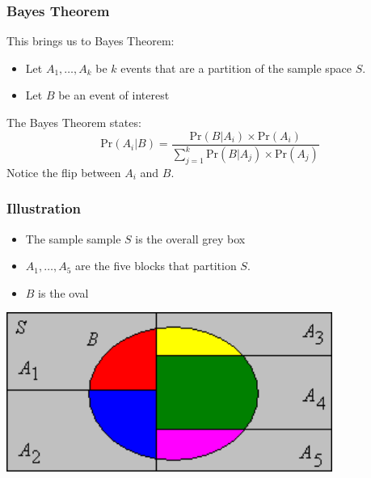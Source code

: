 \documentclass[slides]{beamer}
\newcommand{\blue}[1]{\textcolor{blue2}{#1}}
\newcommand{\prob}{\mbox{Pr}}
\begin{document}
\begin{frame}[fragile]
\frametitle{Bayes Theorem}
This brings us to Bayes Theorem: 
\pause\begin{itemize}
\item Let $A_1, \ldots, A_k$ be $k$ events that are a \blue{partition} of the sample space $S$.
\item Let $B$ be an event of interest
\end{itemize}
\pause
\vspace{0.5cm}

The Bayes Theorem states: 
\[
\prob(A_i|B) = \frac{\prob(B|A_i)\times\prob(A_i)}{\sum_{j=1}^{k}\prob(B|A_j)\times\prob(A_j)} 
\]
\pause
Notice the flip between $A_i$ and $B$.
\end{frame}


\begin{frame}[fragile]
\frametitle{Illustration}

\begin{itemize}
\item The sample sample $S$ is the overall grey box
\item $A_1, \ldots, A_5$ are the five blocks that partition $S$.  
\item $B$ is the oval
\end{itemize}

\begin{center}
\includegraphics[width=0.8\textwidth]{figure/lotp.png} 
\end{center}

\end{frame}
\end{document}
